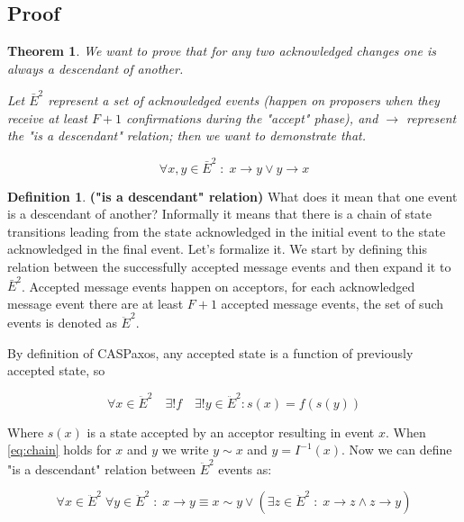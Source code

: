 \documentclass[12pt]{article}
\newtheorem{theorem}{Theorem}
\theoremstyle{definition}
\newtheorem*{definition}{Definition}
\begin{document}
\begin{appendices}
\section{Proof}
\label{appendix:proof}

\begin{theorem} \label{th:proof}
  We want to prove that for any two acknowledged changes one is always a descendant of another.
  
  Let $\bar{E}^2$ represent a set of acknowledged events (happen on proposers when they receive at least $F+1$ confirmations during the "accept" phase), and $\to$ represent the "is a descendant" relation; then we want to demonstrate that.

  \begin{equation}
    \forall x,y \in \bar{E}^2 \;:\; x \to y \lor y \to x
  \end{equation}
\end{theorem}

\theoremstyle{definition}
\begin{definition}{\bf("is a descendant" relation)}
  What does it mean that one event is a descendant of another? Informally it means that there is a chain of state transitions leading from the state acknowledged in the initial event to the state acknowledged in the final event. Let's formalize it. We start by defining this relation between the successfully accepted message events and then expand it to $\bar{E}^2$. Accepted message events happen on acceptors, for each acknowledged message event there are at least $F+1$ accepted message events, the set of such events is denoted as $\ddot{E}^2$.

  By definition of CASPaxos, any accepted state is a function of previously accepted state, so
  
  \begin{equation} \label{eq:chain}
    \forall x \in \ddot{E}^2 \quad \exists ! f \quad \exists ! y \in \ddot{E}^2 : s(x) = f(s(y))
  \end{equation}
  
  Where $s(x)$ is a state accepted by an acceptor resulting in event $x$. When \ref{eq:chain} holds for $x$ and $y$ we write $y \sim x$ and $y = I^{-1}(x)$. Now we can define "is a descendant" relation between $\ddot{E}^2$ events as:
  
  \begin{equation}
    \forall x \in \ddot{E}^2 \; \forall y \in \ddot{E}^2 \;:\; x \to y \equiv x \sim y \lor (\exists z \in \ddot{E}^2 \;:\; x \to z \land z \to y)
  \end{equation}
  

\end{definition}
\end{appendices}
\end{document}
